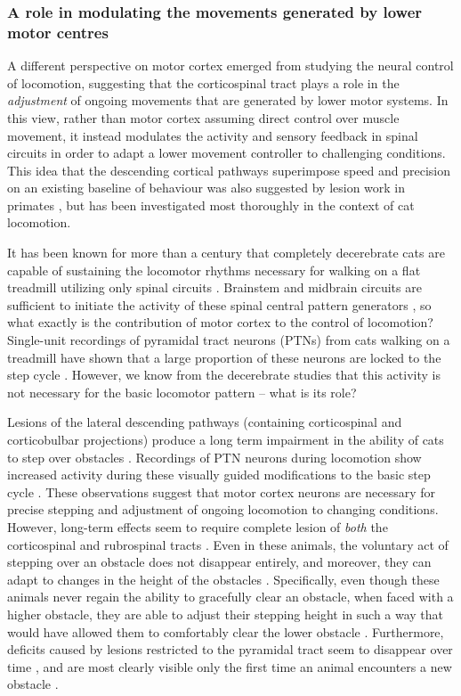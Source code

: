 \subsubsection*{A role in modulating the movements generated by lower motor centres}

A different perspective on motor cortex emerged from studying the neural control of locomotion, suggesting that the corticospinal tract plays a role in the \emph{adjustment} of ongoing movements that are generated by lower motor systems. In this view, rather than motor cortex assuming direct control over muscle movement, it instead modulates the activity and sensory feedback in spinal circuits in order to adapt a lower movement controller to challenging conditions. This idea that the descending cortical pathways superimpose speed and precision on an existing baseline of behaviour was also suggested by lesion work in primates \cite{Lawrence1968a}, but has been investigated most thoroughly in the context of cat locomotion.

It has been known for more than a century that completely decerebrate cats are capable of sustaining the locomotor rhythms necessary for walking on a flat treadmill utilizing only spinal circuits \cite{GrahamBrown1911}. Brainstem and midbrain circuits are sufficient to initiate the activity of these spinal central pattern generators \cite{Grillner1973}, so what exactly is the contribution of motor cortex to the control of locomotion? Single-unit recordings of pyramidal tract neurons (PTNs) from cats walking on a treadmill have shown that a large proportion of these neurons are locked to the step cycle \cite{Armstrong1984a}. However, we know from the decerebrate studies that this activity is not necessary for the basic locomotor pattern -- what is its role?

Lesions of the lateral descending pathways (containing corticospinal and corticobulbar projections) produce a long term impairment in the ability of cats to step over obstacles \cite{Drew2002}. Recordings of PTN neurons during locomotion show increased activity during these visually guided modifications to the basic step cycle \cite{Drew1996}. These observations suggest that motor cortex neurons are necessary for precise stepping and adjustment of ongoing locomotion to changing conditions. However, long-term effects seem to require complete lesion of \emph{both} the corticospinal and rubrospinal tracts \cite{Drew2002}. Even in these animals, the voluntary act of stepping over an obstacle does not disappear entirely, and moreover, they can adapt to changes in the height of the obstacles \cite{Drew2002}. Specifically, even though these animals never regain the ability to gracefully clear an obstacle, when faced with a higher obstacle, they are able to adjust their stepping height in such a way that would have allowed them to comfortably clear the lower obstacle \cite{Drew2002}. Furthermore, deficits caused by lesions restricted to the pyramidal tract seem to disappear over time \cite{Liddell1944}, and are most clearly visible only the first time an animal encounters a new obstacle \cite{Liddell1944}.

